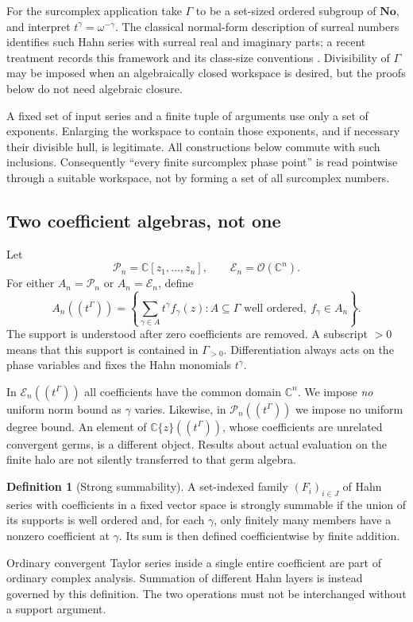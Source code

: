 \documentclass[11pt,letterpaper]{article}
\numberwithin{equation}{section}
\theoremstyle{definition}
\newtheorem{definition}[theorem]{Definition}
\theoremstyle{remark}
\newcommand{\C}{\mathbb C}
\newcommand{\No}{\mathbf{No}}
\newcommand{\E}{\mathscr E}
\newcommand{\Pp}{\mathscr P}
\newcommand{\OO}{\mathcal O}
\newcommand{\HH}[1]{#1((t^\Gamma))}
\begin{document}
For the surcomplex application take $\Gamma$ to be a set-sized ordered
subgroup of $\No$, and interpret $t^\gamma=\omega^{-\gamma}$. The classical
normal-form description of surreal numbers identifies such Hahn series with
surreal real and imaginary parts; a recent treatment records this framework
and its class-size conventions \cite{kaplan}. Divisibility of $\Gamma$ may be
imposed when an algebraically closed workspace is desired, but the proofs
below do not need algebraic closure.

A fixed set of input series and a finite tuple of arguments use only a set
of exponents. Enlarging the workspace to contain those exponents, and if
necessary their divisible hull, is legitimate. All constructions below
commute with such inclusions. Consequently ``every finite surcomplex phase
point'' is read pointwise through a suitable workspace, not by forming a set
of all surcomplex numbers.

\subsection{Two coefficient algebras, not one}
Let
\[
 \Pp_n=\C[z_1,\ldots,z_n],\qquad
 \E_n=\OO(\C^n).
\]
For either $A_n=\Pp_n$ or $A_n=\E_n$, define
\begin{equation}\label{eq:coeffalgebra}
 \HH{A_n}=
 \left\{\sum_{\gamma\in A}t^\gamma f_\gamma(z):
 A\subseteq\Gamma\text{ well ordered},\ f_\gamma\in A_n\right\}.
\end{equation}
The support is understood after zero coefficients are removed. A subscript
$>0$ means that this support is contained in $\Gamma_{>0}$. Differentiation
always acts on the phase variables and fixes the Hahn monomials $t^\gamma$.

In $\HH{\E_n}$ all coefficients have the common domain $\C^n$. We impose
\emph{no} uniform norm bound as $\gamma$ varies. Likewise, in
$\HH{\Pp_n}$ we impose no uniform degree bound. An element of
$\HH{\C\{z\}}$, whose coefficients are unrelated convergent germs, is a
different object. Results about actual evaluation on the finite halo are not
silently transferred to that germ algebra.

\begin{definition}[Strong summability]
A set-indexed family $(F_i)_{i\in J}$ of Hahn series with coefficients in a
fixed vector space is strongly summable if the union of its supports is well
ordered and, for each $\gamma$, only finitely many members have a nonzero
coefficient at $\gamma$. Its sum is then defined coefficientwise by finite
addition.
\end{definition}
Ordinary convergent Taylor series inside a single entire coefficient are
part of ordinary complex analysis. Summation of different Hahn layers is
instead governed by this definition. The two operations must not be
interchanged without a support argument.
\end{document}
